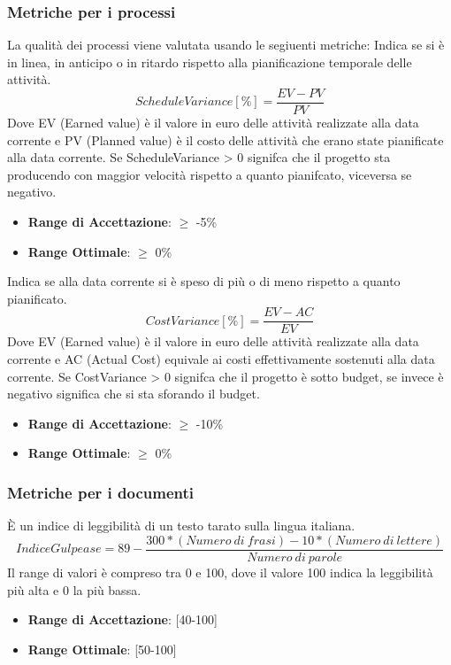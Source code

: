 \documentclass[12pt,a4paper]{article}
\begin{document}
\subsubsection{Metriche per i processi}
La qualità dei processi viene valutata usando le segiuenti metriche:
Indica se si è in linea, in anticipo o in ritardo rispetto alla pianificazione temporale delle attività.
\[ScheduleVariance [\%] = \frac{EV - PV}{PV}\]
Dove EV (Earned value) è il valore in euro delle attività realizzate alla data corrente e PV (Planned value) è il costo delle attività che erano state pianificate alla data corrente.
Se ScheduleVariance > 0 signifca che il progetto sta producendo con maggior velocità rispetto a quanto pianifcato, viceversa se negativo.
\begin{itemize}
\item \textbf{Range di Accettazione}: $\geq$ -5\%
\item \textbf{Range Ottimale}: $\geq$ 0\%
\end{itemize}
Indica se alla data corrente si è speso di più o di meno rispetto a quanto pianificato.
\[CostVariance [\%] = \frac{EV - AC}{EV}\]
Dove EV (Earned value) è il valore in euro delle attività realizzate alla data corrente e AC (Actual Cost) equivale ai costi effettivamente sostenuti alla data corrente.
Se CostVariance > 0 signifca che il progetto è sotto budget, se invece è negativo significa che si sta sforando il budget.
\begin{itemize}
\item \textbf{Range di Accettazione}: $\geq$ -10\%
\item \textbf{Range Ottimale}: $\geq$ 0\%
\end{itemize}
\subsubsection{Metriche per i documenti}
È un indice di leggibilità di un testo tarato sulla lingua italiana.
\[IndiceGulpease=89-\frac{300*(Numero\ di\ frasi)-10*(Numero\ di\ lettere)}{Numero\ di\ parole}\]
Il range di valori è compreso tra 0 e 100, dove il valore 100 indica la leggibilità più alta e 0 la più bassa.
\begin{itemize}
\item \textbf{Range di Accettazione}: [40-100]
\item \textbf{Range Ottimale}: [50-100]
\end{itemize}
\end{document}
